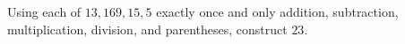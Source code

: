 Using each of $13,169,15,5$ exactly once and only addition, subtraction, multiplication, division, and parentheses, construct $23$.
